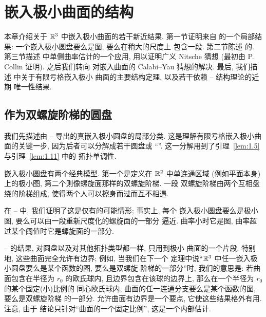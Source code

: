 \chapter{嵌入极小曲面的结构}
\label{chap:8}

{\setlength{\emergencystretch}{2em}%
本章介绍关于 $\mathbb{R}^3$ 中嵌入极小曲面的若干新近结果. 第一节证明来自
\cite{CM4} 的一个局部结果: 一个嵌入极小圆盘要么是图, 要么在稍大的尺度上
包含一段. 第二节陈述 \cite{CM6} 的. 第三节描述
\cite{CM10} 中单侧曲率估计的一个应用, 用以证明广义 Nitsche 猜想
(最初由 P. Collin \cite{Co} 证明). 之后我们转向 \cite{CM24} 对嵌入曲面的
Calabi--Yau 猜想的解决. 最后, 我们描述 \cite{CM7} 中关于有限亏格嵌入极小
曲面的主要结构定理, 以及若干依赖 \cite{CM3}--\cite{CM7} 结构理论的近期
唯一性结果.\par}

\section{作为双螺旋阶梯的圆盘}
\label{sec:8.1}

我们先描述由 \cite{CM3}--\cite{CM6} 导出的真嵌入极小圆盘的局部分类.
这是理解有限亏格嵌入极小曲面的关键一步, 因为后者可以分解成若干圆盘或
``''. 这一分解用到了引理~\ref{lem:1.5} 与引理~\ref{lem:1.11} 中的
拓扑单调性.

嵌入极小圆盘有两个经典模型. 第一个是定义在 $\mathbb{R}^2$ 中单连通区域
(例如平面本身)上的极小图, 第二个则像螺旋面那样的双螺旋阶梯. 一段
双螺旋阶梯由两个互相盘绕的阶梯组成, 使得两个人可以擦身而过而互不相遇.

在 \cite{CM3}--\cite{CM6} 中, 我们证明了这是仅有的可能情形; 事实上, 每个
嵌入极小圆盘要么是极小图, 要么可以由一段重新尺度化的螺旋面的一部分
逼近. 曲率小时它是图, 曲率超过某个阈值时它是螺旋面的一部分.

\cite{CM3}--\cite{CM6} 的结果, 对圆盘以及对其他拓扑类型都一样, 只用到极小
曲面的一个片段. 特别地, 这些曲面完全允许有边界; 例如, 当我们在下一个
定理中说``$\mathbb{R}^3$ 中任一嵌入极小圆盘要么是某个函数的图, 要么是双螺旋
阶梯的一部分''时, 我们的意思是: 若曲面包含在半径为 $r_0$ 的欧氏球内,
且边界包含在该球的边界上, 那么在一个半径为 $r_0$ 的某个固定(小)比例的
同心欧氏球内, 曲面的任一连通分支要么是某个函数的图, 要么是双螺旋阶梯
的一部分. 允许曲面有边界是一个要点, 它使这些结果格外有用. 注意, 由于
结论只针对``曲面的一个固定比例'', 这是一个内部估计.

